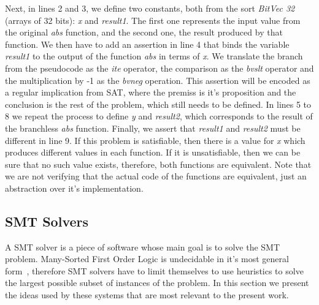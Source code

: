Next, in lines 2 and 3, we define two constants, both from the sort \textit{BitVec 32} (arrays of 32 bits): \textit{x} and \textit{result1}. The first one represents the input value from the original \textit{abs} function, and the second one, the result produced by that function. We then have to add an assertion in line 4 that binds the variable \textit{result1} to the output of the function \textit{abs} in terms of \textit{x}. We translate the branch from the pseudocode as the \textit{ite} operator, the comparison as the \textit{bvslt} operator and the multiplication by -1 as the \textit{bvneg} operation. This assertion will be encoded as a regular implication from SAT, where the premiss is it's proposition and the conclusion is the rest of the problem, which still needs to be defined. In lines 5 to 8 we repeat the process to define \textit{y} and \textit{result2}, which corresponds to the result of the branchless \textit{abs} function. Finally, we assert that \textit{result1} and \textit{result2} must be different in line 9. If this problem is satisfiable, then there is a value for \textit{x} which produces different values in each function. If it is unsatisfiable, then we can be sure that no such value exists, therefore, both functions are equivalent. Note that we are not verifying that the actual code of the functions are equivalent, just an abstraction over it's implementation.

%



\subsection{SMT Solvers}

A SMT solver is a piece of software whose main goal is to solve the SMT problem. Many-Sorted First Order Logic is undecidable in it's most general form~\cite{fol_undec}, therefore SMT solvers have to limit themselves to use heuristics to solve the largest possible subset of instances of the problem. In this section we present the ideas used by these systems that are most relevant to the present work.


